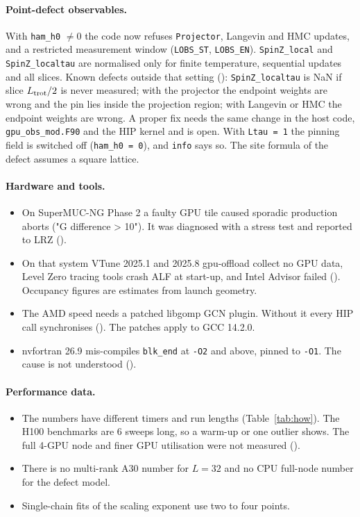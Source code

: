\paragraph{Point-defect observables.} With \texttt{ham\_h0} $\ne0$ the code now refuses \texttt{Projector}, Langevin and HMC updates, and a restricted measurement window (\texttt{LOBS\_ST}, \texttt{LOBS\_EN}). \texttt{SpinZ\_local} and \texttt{SpinZ\_localtau} are normalised only for finite temperature, sequential updates and all slices. Known defects outside that setting (): \texttt{SpinZ\_localtau} is NaN if slice $L_{\rm trot}/2$ is never measured; with the projector the endpoint weights are wrong and the pin lies inside the projection region; with Langevin or HMC the endpoint weights are wrong. A proper fix needs the same change in the host code, \texttt{gpu\_obs\_mod.F90} and the HIP kernel and is open. With \texttt{Ltau = 1} the pinning field is switched off (\texttt{ham\_h0 = 0}), and \texttt{info} says so. The site formula of the defect assumes a square lattice.

\paragraph{Hardware and tools.}
\begin{itemize}
\item On SuperMUC-NG Phase 2 a faulty GPU tile caused sporadic production aborts ("G difference > 10"). It was diagnosed with a stress test and reported to LRZ ().
\item On that system VTune 2025.1 and 2025.8 gpu-offload collect no GPU data, Level Zero tracing tools crash ALF at start-up, and Intel Advisor failed (). Occupancy figures are estimates from launch geometry.
\item The AMD speed needs a patched libgomp GCN plugin. Without it every HIP call synchronises (). The patches apply to GCC 14.2.0.
\item nvfortran 26.9 mis-compiles \texttt{blk\_end} at \texttt{-O2} and above, pinned to \texttt{-O1}. The cause is not understood ().
\end{itemize}

\paragraph{Performance data.}
\begin{itemize}
\item The numbers have different timers and run lengths (Table~\ref{tab:how}). The H100 benchmarks are 6 sweeps long, so a warm-up or one outlier shows. The full 4-GPU node and finer GPU utilisation were not measured ().
\item There is no multi-rank A30 number for $L=32$ and no CPU full-node number for the defect model.
\item Single-chain fits of the scaling exponent use two to four points.
\end{itemize}

